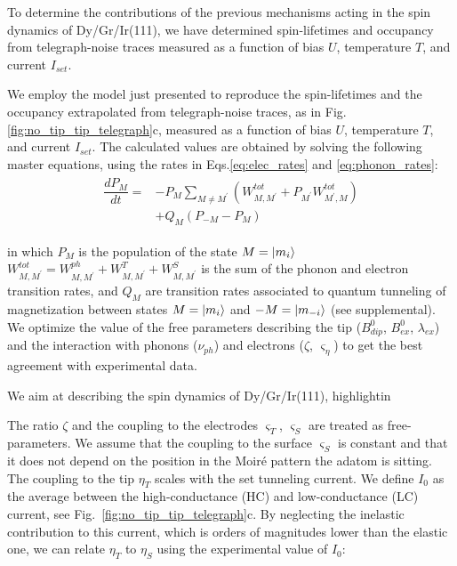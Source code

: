 \documentclass[
reprint,amsmath,amssymb,aps]{revtex4-2}
\begin{document}
To determine the contributions of the previous mechanisms acting in the spin dynamics of Dy/Gr/Ir(111), we have determined spin-lifetimes and occupancy from telegraph-noise traces measured as a function of bias $U$, temperature $T$, and current $I_{set}$. 

We employ the model just presented to reproduce the spin-lifetimes and the occupancy extrapolated from telegraph-noise traces, as in Fig. \ref{fig:no_tip_tip_telegraph}c, measured as a function of bias $U$, temperature $T$, and current $I_{set}$. The calculated values are obtained by solving the following master equations, using the rates in Eqs.\ref{eq:elec_rates} and \ref{eq:phonon_rates}:
\begin{align}
\begin{split}
\dfrac{dP_M}{dt}=&-P_M \sum_{M\neq M^{\prime}}\left(   W_{M,M^{\prime}}^{tot}  +P_{M^{\prime}}  W_{M^{\prime},M}^{tot}  \right) \\
&+ Q_M \left(P_{-M}- P_{M} \right)
\end{split}
\end{align}

in which $P_M$ is the population of the state $M=\ket{m_i}$ $W_{M,M^{\prime}}^{tot}=W_{M,M^{\prime}}^{ph}+W_{M,M^{\prime}}^{T}+W_{M,M^{\prime}}^{S}$ is the sum of the phonon and electron transition rates, and $Q_M$ are transition rates associated to quantum tunneling of magnetization between states $M=\ket{m_i}$ and $-M=\ket{m_{-i}}$ \cite{} (see supplemental).
We optimize the value of the free parameters describing the tip ($B^0_{dip}$, $B^0_{ex}$, $\lambda_{ex}$) and the interaction with phonons ($\nu_{ph}$) and electrons ($\zeta$, $\varsigma_{\eta}$) to get the best agreement with experimental data.




We aim at describing the spin dynamics of Dy/Gr/Ir(111), highlightin



The ratio $\zeta$ and the coupling to the electrodes $\varsigma_T$, $\varsigma_S$ are treated as free-parameters. We assume that the coupling to the surface $\varsigma_S$ is constant and that it does not depend on the position in the Moiré pattern the adatom is sitting. The coupling to the tip $\eta_T$ scales with the set tunneling current. We define $I_0$ as the average between the high-conductance (HC) and low-conductance (LC) current, see Fig.~\ref{fig:no_tip_tip_telegraph}c. By neglecting the inelastic contribution to this current, which is orders of magnitudes lower than the elastic one, we can relate $\eta_T$ to $\eta_S$ using the experimental value of $I_0$:
\end{document}
